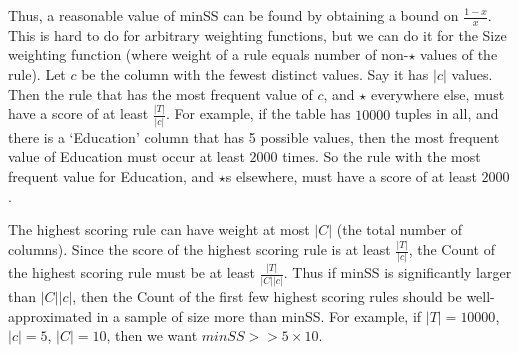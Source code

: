 {Thus, a reasonable value of minSS can be found by obtaining a bound on $\frac{1-x}{x}$. This is hard to do for arbitrary weighting functions, but we can do it for the Size weighting function (where weight of a rule equals number of non-$\star$ values of the rule). Let $c$ be the column with the fewest distinct values. Say it has $|c|$ values. Then the rule that has the most frequent value of $c$, and $\star$ everywhere else, must have a score of at least $\frac{|T|}{|c|}$. For example, if the table has $10000$ tuples in all, and there is a `Education' column that has 5 possible values, then the most frequent value of Education must occur at least $2000$ times. So the rule with the most frequent value for Education, and $\star$s elsewhere, must have a score of at least $2000$. 

The highest scoring rule can have weight at most $|C|$ (the total number of columns). Since the score of the highest scoring rule is at least $\frac{|T|}{|c|}$, the Count of the highest scoring rule must be at least $\frac{|T|}{|C||c|}$. Thus if minSS is significantly larger than $|C||c|$, then the Count of the first few highest scoring rules should be well-approximated in a sample of size more than minSS. For example, if $|T| = 10000$, $|c| = 5$, $|C| = 10$, then we want $minSS >> 5 \times 10$.
}



